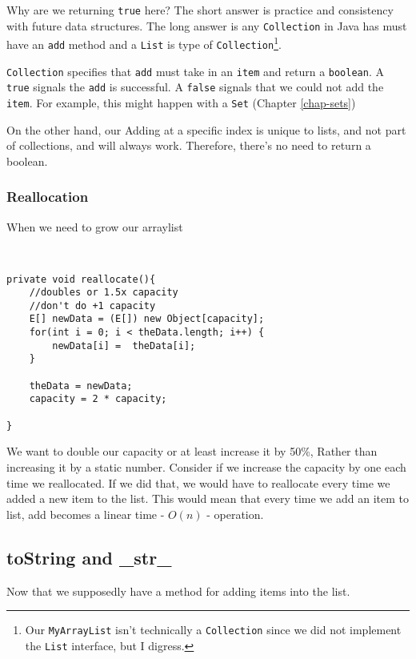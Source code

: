 Why are we returning \texttt{true} here?
The short answer is practice and consistency with future data structures.
The long answer is any \texttt{Collection} in Java has must have an \texttt{add} method and a \texttt{List} is type of \texttt{Collection}\footnote{Our \texttt{MyArrayList} isn't technically a \texttt{Collection} since we did not implement the \texttt{List} interface, but I digress.}.

\texttt{Collection} specifies that \texttt{add} must take in an \texttt{item} and return a \texttt{boolean}.
A \texttt{true} signals the \texttt{add} is successful.
A \texttt{false} signals that we could not add the \texttt{item}.
For example, this might happen with a \texttt{Set} (Chapter \ref{chap-sets})


On the other hand, our Adding at a specific index is unique to lists, and not part of collections,  and will always work. Therefore, there's no need to return a boolean. 

\subsubsection{Reallocation}
\label{arraylist-reallocate}
When we need to grow our arraylist
\begin{verbatim}


private void reallocate(){
	//doubles or 1.5x capacity
	//don't do +1 capacity
	E[] newData = (E[]) new Object[capacity];
	for(int i = 0; i < theData.length; i++) {
		newData[i] =  theData[i];
	}
	
	theData = newData;
	capacity = 2 * capacity;
	
}
\end{verbatim}

We want to double our capacity or at least increase it by 50\%, Rather than increasing it by a static number.
Consider if we increase the capacity by one each time we reallocated.  If we did that, we would have to reallocate every time we added a new item to the list.  This would mean that every time we add an item to list, add becomes a linear time - $O(n)$ - operation.


\subsection{toString and \_str\_}
Now that we supposedly have a method for adding items into the list.


